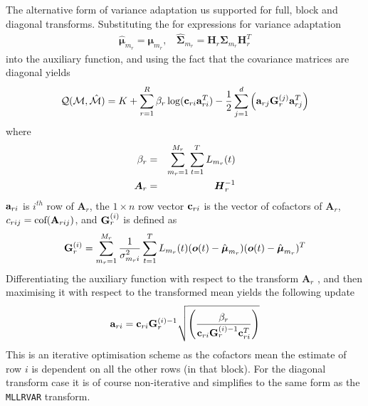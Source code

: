 The alternative form of variance adaptation us supported for full,
block and diagonal transforms. Substituting the for expressions for
variance adaptation
\begin{eqnarray}
\hat{\bm{\mu}}_{m_r} = \bm{\mu}_{m_r}, \:\:\:\: 
\hat{\bm{\Sigma}}_{m_r} = {\bm H}_r{\bm{\Sigma}}_{m_r}{\bm H}_r^T
\end{eqnarray}
into the auxiliary function, and using the fact that the covariance
matrices are diagonal yields
\begin{eqnarray}
{\cal Q}({\cal M},{\hat{\cal M}}) = K + 
\sum_{r=1}^R
\beta_r\log({\bf c}_{ri}{\bf a}_{ri}^T)-
\frac{1}{2}
\sum_{j=1}^d{
\left({\bf a}_{rj}{\bf G}^{(j)}_r{\bf a}^T_{rj}
\right)} \nonumber
\end{eqnarray}
where 
\begin{eqnarray}
\beta_r &=& \sum_{m_r=1}^{M_r}\sum_{t=1}^T\like\\
{\bm A}_r &=& {\bm H}_r^{-1}
\end{eqnarray}
${\bf a}_{ri}$ is $i^{th}$ row of ${\bm
A}_r$, the $1\times n$ row vector ${\bf c}_{ri}$ is the vector of
cofactors of ${\bm A}_r$, $c_{rij}={\mbox{cof}}({\bf A}_{rij})$,
and  ${\bf G}^{(i)}_r$ is defined as
\begin{eqnarray}
{\bf G}^{(i)}_r=\sum_{m_r=1}^{M_r}
\frac{1}{\sigma_{m_ri}^{2}}
\sum_{t=1}^T\like(\bm{o}(t)-\hat{\bm{\mu}}_{m_r})
(\bm{o}(t)-\hat{\bm{\mu}}_{m_r})^T
\label{eq:gi_mllr2}
\end{eqnarray}
Differentiating the auxiliary function with respect to the transform
${\bm A}_r$ , and then maximising it with respect to the transformed mean
yields the following update
\begin{eqnarray}
{\bf a}_{ri} ={\bf c}_{ri}{\bf G}^{(i)-1}_r
\sqrt{\left(\frac{\beta_r}{{\bf
c}_{ri}{\bf G}_r^{(i)-1}{\bf c}^T_{ri}}\right)}
\end{eqnarray}
This is an iterative optimisation scheme as the cofactors mean the estimate
of row $i$ is dependent on all the other rows (in that block). For the 
diagonal transform case it is of course non-iterative and simplifies to
the same form as the {\tt MLLRVAR} transform.


